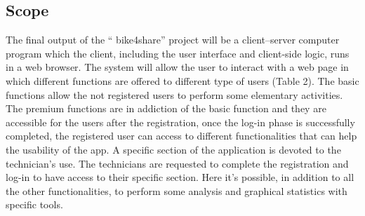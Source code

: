 \documentclass{article}
\begin{document}
\subsection{Scope}
The final output of the “ bike4share” project will be a client–server computer program which the client, including the user interface and client-side logic, runs in a web browser.
The system will allow  the user to interact with a web page in which different functions are offered to different type of users (Table 2).
The basic functions allow the not registered users to perform some elementary activities.  
The premium functions are in addiction of the basic function and they are  accessible for the users after the registration, once the log-in phase is successfully completed, the registered user can access to different functionalities that can help the usability of the app.
A specific section of the application is devoted to the technician’s use. 
The technicians are requested to complete the registration and log-in to have access to their specific section. Here it's possible, in addition to all the other functionalities, to perform some analysis and graphical statistics with specific tools.
\end{document}
